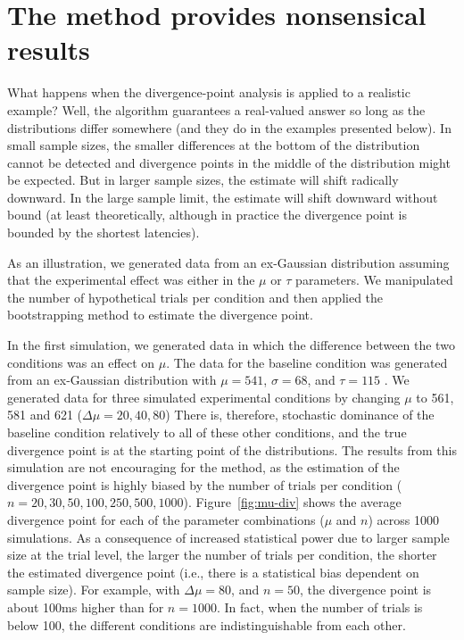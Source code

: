 \documentclass[man]{apa}%
\begin{document}
  \section{The method provides nonsensical results}

      
What happens when the divergence-point analysis is applied to a realistic example?  Well, the algorithm guarantees a real-valued answer so long as the distributions differ somewhere (and they do in the examples presented below).   In small sample sizes, the smaller differences at the bottom of the distribution cannot be detected and divergence points in the middle of the distribution might be expected.  But in larger sample sizes, the estimate will shift radically downward.  In the large sample limit, the estimate will shift downward without bound (at least theoretically, although in practice the divergence point is bounded by the shortest latencies).  

        As an illustration, we generated data from an ex-Gaussian distribution assuming that the experimental effect was either in the $\mu$ or $\tau$ parameters.  We manipulated the number of hypothetical trials per condition and then applied the bootstrapping method to estimate the divergence point.

      In the first simulation, we generated data in which the difference between the two conditions was an effect on $\mu$.  The data for the baseline condition was generated from an ex-Gaussian distribution with $\mu= 541$, $\sigma = 68$, and $\tau = 115$ . We generated data for three simulated experimental conditions by changing $\mu$ to 561, 581 and 621  ($\Delta \mu = 20, 40, 80$) There is, therefore, stochastic dominance of the baseline condition relatively to all of these other conditions, and the true divergence point is at the starting point of the distributions.  The results from this simulation are not encouraging for the method, as the estimation of the divergence point is highly biased by the number of trials per condition ($n = 20, 30, 50, 100, 250, 500, 1000$).   Figure~\ref{fig:mu-div} shows the average divergence point for each of the parameter combinations ($\mu$ and $n$) across 1000 simulations. As a consequence of increased statistical power due to larger sample size at the trial level, the larger the number of trials per condition, the shorter the estimated divergence point (i.e., there is a statistical bias dependent on sample size). For example, with $\Delta \mu =  80$, and $n=50$, the divergence point is about 100ms higher than for $n = 1000$.  In fact, when the number of trials is below 100, the different conditions are indistinguishable from each other. 
      
\end{document}
